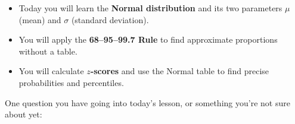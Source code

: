 \documentclass[10pt]{article}
\begin{document}
\vspace{0.14in}

\begin{tcolorbox}[colback=greenbg, colframe=greenacc, boxrule=0.8pt, arc=2mm,
    left=4mm, right=4mm, top=3mm, bottom=3mm]
\small
\begin{itemize}[leftmargin=1.3em, itemsep=5pt]
  \item Today you will learn the \textbf{Normal distribution} and its two parameters
        $\mu$ (mean) and $\sigma$ (standard deviation).
  \item You will apply the \textbf{68--95--99.7 Rule} to find approximate proportions
        without a table.
  \item You will calculate \textbf{$z$-scores} and use the Normal table to find
        precise probabilities and percentiles.
\end{itemize}
\end{tcolorbox}

\vspace{0.12in}

\noindent\textcolor{slate}{\small One question you have going into today's lesson,
or something you're not sure about yet:}\\[8pt]
\writeline
\end{document}
